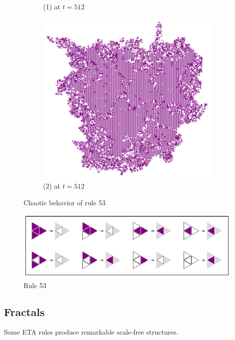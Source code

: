 \documentclass{article}
\begin{document}
\begin{figure}[H]
\begin{subfigure}[b]{0.48\textwidth}
         \caption*{(1) at $t=512$}
     \end{subfigure}
     \begin{subfigure}[b]{0.48\textwidth}
         \centering
         \includegraphics[width=\textwidth]{graphics/behavior/chaos/chaos-2-2.pdf}
         \caption*{(2) at $t=512$}
     \end{subfigure}
     \caption{Chaotic behavior of rule 53}
        \label{fig:chaos}
\end{figure}

\bigskip

\begin{figure}[H]
    \centering
        \includegraphics[width=.7\textwidth]{graphics/behavior/chaos/rule-53.pdf}
    \caption{Rule 53}
    \label{fig:rule-plot-53}
\end{figure}

\pagebreak
\subsection{Fractals} \label{fractals}
Some ETA rules produce remarkable scale-free structures. 
\end{document}
